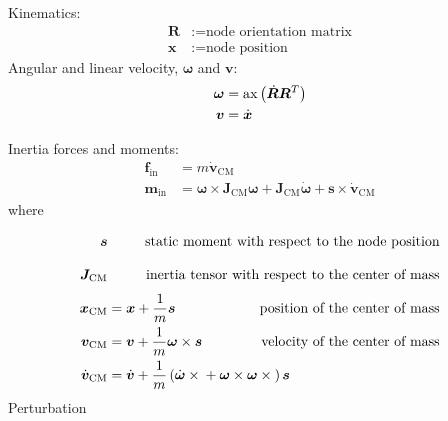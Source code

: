 \documentclass[10pt,dvips,fleqn,subeqn]{report}
\newcommand{\T}[1]{\bm{#1}}
\newcommand{\TT}[1]{\bm{#1}}
\begin{document}
Kinematics:
\begin{subequations}
\begin{align}
	\TT{R} &:= \text{node orientation matrix} \\
	\T{x} &:= \text{node position}
\end{align}
\end{subequations}
Angular and linear velocity, $\T{\omega}$ and $\T{v}$:
\begin{subequations}
\begin{align}
	\T{\omega} &= \mathrm{ax}\plbr{\dot{\TT{R}} \TT{R}^T} \\
	\T{v} &= \dot{\T{x}}
\end{align}
\end{subequations}

Inertia forces and moments:
\begin{subequations}
\begin{align}
	\T{f}_{\text{in}} &= m \dot{\T{v}}_{\text{CM}} \\
	\T{m}_{\text{in}} &=
	\T{\omega} \times \TT{J}_{\text{CM}} \T{\omega}
	+ \TT{J}_{\text{CM}} \dot{\T{\omega}}
	+ \T{s} \times \dot{\T{v}}_{\text{CM}}
\end{align}
\end{subequations}
where
\begin{subequations}
\begin{align}
	\T{s} & \vphantom{\frac{1}{m}}
		&\hspace{-40mm} \text{static moment with respect to the node position} \\
	\TT{J}_{\text{CM}} & \vphantom{\frac{1}{m}}
		&\hspace{-40mm} \text{inertia tensor with respect to the center of mass} \\
	\T{x}_{\text{CM}} &= \T{x} + \frac{1}{m} \T{s}
		&\hspace{-40mm} \text{position of the center of mass} \\
	\T{v}_{\text{CM}} &= \T{v} + \frac{1}{m} \T{\omega} \times \T{s}
		&\hspace{-40mm} \text{velocity of the center of mass} \\
	\dot{\T{v}}_{\text{CM}} &= \dot{\T{v}}
		+ \frac{1}{m}\plbr{
			\dot{\T{\omega}}\times{}
			+ \T{\omega}\times\T{\omega}\times{}
		} \T{s}
\end{align}
\end{subequations}
Perturbation
\end{document}

